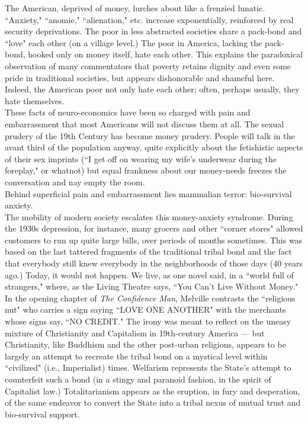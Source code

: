 The American, deprived of money, lurches about like a frenzied lunatic. ``Anxiety," ``anomie," ``alienation," etc. increase exponentially, reinforced by real security deprivations. The poor in less abstracted societies share a pack-bond and ``love" each other (on a village level.) The poor in America, lacking the pack-bond, hooked only on money itself, hate each other. This explains the paradoxical observation of many commentators that poverty retains dignity and even some pride in traditional societies, but appears dishonorable and shameful here. Indeed, the American poor not only hate each other; often, perhaps usually, they hate themselves.\\
These facts of neuro-economics have been so charged with pain and embarrassment that most Americans will not discuss them at all. The sexual prudery of the 19th Century has become money prudery. People will talk in the avant third of the population anyway, quite explicitly about the fetishistic aspects of their sex imprints (``I get off on wearing my wife's underwear during the foreplay," or whatnot) but equal frankness about our money-needs freezes the conversation and nay empty the room.\\
Behind superficial pain and embarrassment lies mammalian terror: bio-survival anxiety.\\
The mobility of modern society escalates this money-anxiety syndrome. During the 1930s depression, for instance,  many grocers and other ``corner stores" allowed customers to run up quite large bills, over periods of months sometimes. This was based on the last tattered fragments of the traditional tribal bond and the fact that everybody still knew everybody in the neighborhoods of those days (40 years ago.) Today, it would not happen. We live, as one novel said, in a ``world full of strangers," where, as the Living Theatre says, ``You Can't Live Without Money."\\
In the opening chapter of \emph{The Confidence Man}, Melville contrasts the ``religious nut" who carries a sign saying ``LOVE ONE ANOTHER" with the merchants whose signs say, ``NO CREDIT." The irony was meant to reflect on the uneasy mixture of Christianity and Capitalism in 19th-century America --- but Christianity, like Buddhism and the other post-urban religions, appears to be largely an attempt to recreate the tribal bond on a mystical level within ``civilized" (i.e., Imperialist) times. Welfarism represents the State's attempt to counterfeit such a bond (in a stingy and paranoid fashion, in the spirit of Capitalist law.) Totalitarianism appears as the eruption, in fury and desperation, of the same endeavor to convert the State into a tribal nexus of mutual trust and bio-survival support.\\
